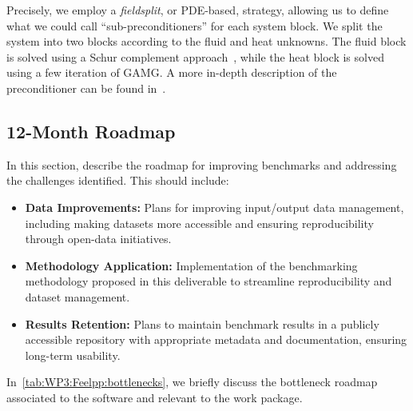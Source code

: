 Precisely, we employ a \emph{fieldsplit}, or PDE-based, strategy, allowing us to define what we could call ``sub-preconditioners'' for each system block.
We split the system into two blocks according to the fluid and heat unknowns.
The fluid block is solved using a Schur complement approach~\cite{elman_finite_2014}, while the heat block is solved using a few iteration of GAMG.
%
A more in-depth description of the preconditioner can be found in~\cite{saigre_coupled_2024_paper}.


\subsection{12-Month Roadmap}
\label{sec:WP3:Feelpp:roadmap}

In this section, describe the roadmap for improving benchmarks and addressing the challenges identified. This should include:
\begin{itemize}
    \item \textbf{Data Improvements:} Plans for improving input/output data management, including making datasets more accessible and ensuring reproducibility through open-data initiatives.
    \item \textbf{Methodology Application:} Implementation of the benchmarking methodology proposed in this deliverable to streamline reproducibility and dataset management.
    \item \textbf{Results Retention:} Plans to maintain benchmark results in a publicly accessible repository with appropriate metadata and documentation, ensuring long-term usability.
\end{itemize}

In~\cref{tab:WP3:Feelpp:bottlenecks}, we briefly discuss the bottleneck roadmap associated to the software and relevant to the work package.

